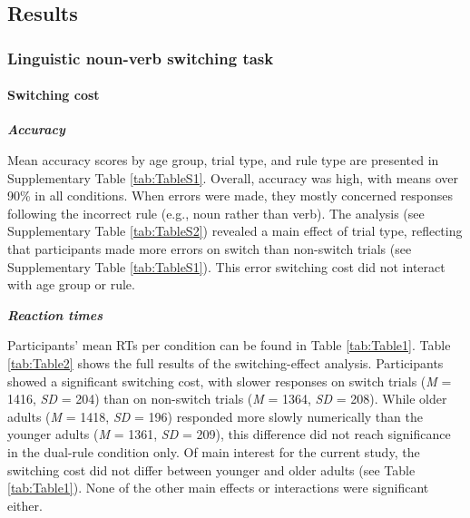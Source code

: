 \documentclass[
]{article}
\begin{document}
\hypertarget{results}{%
\subsection{Results}\label{results}}

\hypertarget{linguistic-noun-verb-switching-task}{%
\subsubsection{Linguistic noun-verb switching task}\label{linguistic-noun-verb-switching-task}}

\hypertarget{switching-cost}{%
\paragraph{Switching cost}\label{switching-cost}}

\hfill\break

\textbf{\emph{Accuracy}}

Mean accuracy scores by age group, trial type, and rule type are presented in Supplementary Table \ref{tab:TableS1}. Overall, accuracy was high, with means over 90\% in all conditions. When errors were made, they mostly concerned responses following the incorrect rule (e.g., noun rather than verb). The analysis (see Supplementary Table \ref{tab:TableS2}) revealed a main effect of trial type, reflecting that participants made more errors on switch than non-switch trials (see Supplementary Table \ref{tab:TableS1}). This error switching cost did not interact with age group or rule.

\textbf{\emph{Reaction times}}

Participants' mean RTs per condition can be found in Table \ref{tab:Table1}. Table \ref{tab:Table2} shows the full results of the switching-effect analysis. Participants showed a significant switching cost, with slower responses on switch trials (\emph{M} = 1416, \emph{SD} = 204) than on non-switch trials (\emph{M} = 1364, \emph{SD} = 208). While older adults (\emph{M} = 1418, \emph{SD} = 196) responded more slowly numerically than the younger adults (\emph{M} = 1361, \emph{SD} = 209), this difference did not reach significance in the dual-rule condition only. Of main interest for the current study, the switching cost did not differ between younger and older adults (see Table \ref{tab:Table1}). None of the other main effects or interactions were significant either.
\end{document}

